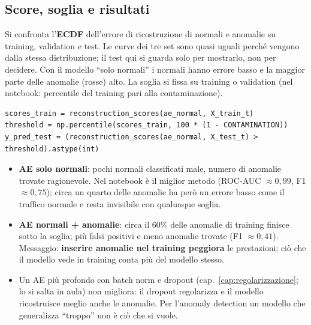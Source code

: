 \subsection{Score, soglia e risultati}
Si confronta l'\textbf{ECDF} dell'errore di ricostruzione di normali e anomalie su training, validation e test. Le curve dei tre set sono
quasi uguali perché vengono dalla stessa distribuzione; il test qui si guarda solo per mostrarlo, non per decidere. Con il modello ``solo
normali'' i normali hanno errore basso e la maggior parte delle anomalie (rosse) alto. La soglia si fissa su training o validation
(nel notebook: percentile del training pari alla contaminazione).
\begin{lstlisting}
scores_train = reconstruction_scores(ae_normal, X_train_t)
threshold = np.percentile(scores_train, 100 * (1 - CONTAMINATION))
y_pred_test = (reconstruction_scores(ae_normal, X_test_t) > threshold).astype(int)
\end{lstlisting}
\begin{itemize}
  \item \textbf{AE solo normali}: pochi normali classificati male, numero di anomalie trovate ragionevole. Nel notebook è il miglior metodo
        (ROC-AUC $\approx 0{,}99$, F1 $\approx 0{,}75$); circa un quarto delle anomalie ha però un errore basso come il traffico normale e resta
        invisibile con qualunque soglia.
  \item \textbf{AE normali + anomalie}: circa il 60\% delle anomalie di training finisce sotto la soglia; più falsi positivi e meno anomalie
        trovate (F1 $\approx 0{,}41$). Messaggio: \textbf{inserire anomalie nel training peggiora} le prestazioni; ciò che il modello vede in
        training conta più del modello stesso.
  \item Un AE più profondo con batch norm e dropout (cap.~\ref{cap:regolarizzazione}; lo si salta in aula) non migliora: il dropout
        regolarizza e il modello ricostruisce meglio anche le anomalie. Per l'anomaly detection un modello che generalizza ``troppo'' non è
        ciò che si vuole.
\end{itemize}

